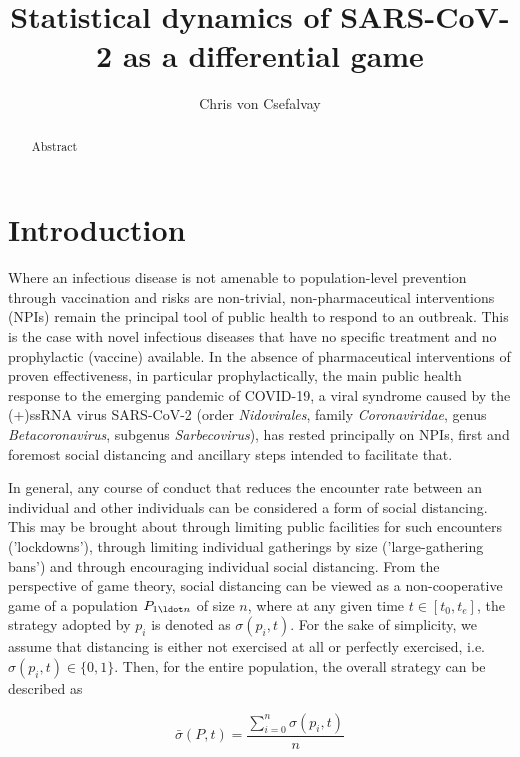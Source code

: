 \documentclass{article}
\title{Statistical dynamics of SARS-CoV-2 as a differential game}
\author{Chris von Csefalvay}
\begin{document}
\maketitle

\begin{abstract}
    Abstract
\end{abstract}

\section{Introduction} %
\label{sec:introduction}
Where an infectious disease is not amenable to population-level prevention through vaccination and risks are non-trivial, non-pharmaceutical interventions (NPIs) remain the principal tool of public health to respond to an outbreak. This is the case with novel infectious diseases that have no specific treatment and no prophylactic (vaccine) available. In the absence of pharmaceutical interventions of proven effectiveness, in particular prophylactically, the main public health response to the emerging pandemic of COVID-19, a viral syndrome caused by the (+)ssRNA virus SARS-CoV-2 (order \emph{Nidovirales}, family \emph{Coronaviridae}, genus \emph{Betacoronavirus}, subgenus \emph{Sarbecovirus}), has rested principally on NPIs, first and foremost social distancing and ancillary steps intended to facilitate that.

In general, any course of conduct that reduces the encounter rate between an individual and other individuals can be considered a form of social distancing. This may be brought about through limiting public facilities for such encounters ('lockdowns'), through limiting individual gatherings by size ('large-gathering bans') and through encouraging individual social distancing. From the perspective of game theory, social distancing can be viewed as a non-cooperative game of a population $P_{1 \ldot n}$ of size $n$, where at any given time $t \in [t_0, t_{e}]$, the strategy adopted by $p_i$ is denoted as $\sigma (p_i, t)$. For the sake of simplicity, we assume that distancing is either not exercised at all or perfectly exercised, i.e. $\sigma (p_i, t) \in \{ 0, 1 \}$. Then, for the entire population, the overall strategy can be described as 

\begin{equation}
	\bar{\sigma}(P, t) = \frac{\displaystyle \sum_{i = 0}^n \sigma(p_i, t)}{n}
	\label{eq:overall_strategy}
\end{equation}
\end{document}
